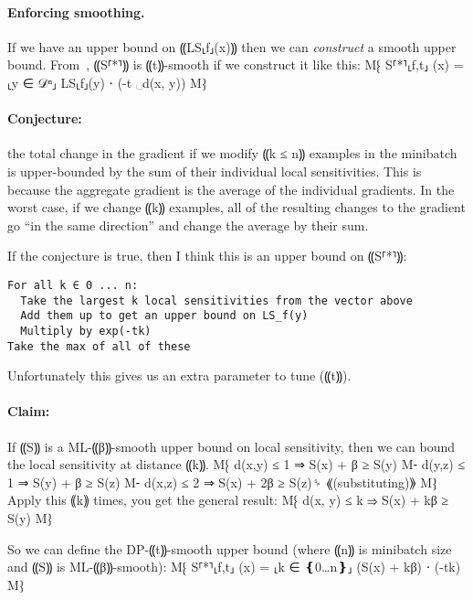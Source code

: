 \documentclass{article}
\begin{document}
\paragraph{Enforcing smoothing.}
If we have an upper bound on ⸨LS⸤f⸥(x)⸩ then we can \emph{construct} a
smooth upper bound. From~\cite{smooth-sensitivity}, ⸨S⸢*⸣⸩ is
⸨t⸩-smooth if we construct it like this:
%
M⁅ S⸢*⸣⸤f,t⸥ (x) = \max⸤y ∈ 𝒟ⁿ⸥ LS⸤f⸥(y) ⋅ \exp(-t ␣d(x, y))
M⁆

\paragraph{Conjecture:} the total change in the gradient if we modify
⸨k ≤ n⸩ examples in the minibatch is upper-bounded by the sum of their
individual local sensitivities. This is because the aggregate gradient
is the average of the individual gradients. In the worst case, if we
change ⸨k⸩ examples, all of the resulting changes to the gradient go
``in the same direction'' and change the average by their sum.


If the conjecture is true, then I think this is an upper bound on ⸨S⸢*⸣⸩:

\begin{verbatim}
For all k ∈ 0 ... n:
  Take the largest k local sensitivities from the vector above
  Add them up to get an upper bound on LS_f(y)
  Multiply by exp(-tk)
Take the max of all of these
\end{verbatim}

Unfortunately this gives us an extra parameter to tune (⸨t⸩).

\paragraph{Claim:} If ⸨S⸩ is a ML-⸨β⸩-smooth upper bound on local
sensitivity, then we can bound the local sensitivity at distance ⸨k⸩.
%
M⁅ d(x,y) ≤ 1 ⇒ S(x) + β ≥ S(y)
M⁃ d(y,z) ≤ 1 ⇒ S(y) + β ≥ S(z)
M⁃ d(x,z) ≤ 2 ⇒ S(x) + 2β ≥ S(z)␠ ⟪(substituting)⟫
M⁆
%
Apply this ⸨k⸩ times, you get the general result:
%
M⁅ d(x, y) ≤ k ⇒ S(x) + kβ ≥ S(y)
M⁆

So we can define the DP-⸨t⸩-smooth upper bound (where ⸨n⸩ is minibatch size
and ⸨S⸩ is ML-⸨β⸩-smooth):
%
M⁅ S⸢*⸣⸤f,t⸥ (x) = \max⸤k ∈ ❴0…n❵⸥ (S(x) + kβ) ⋅ \exp(-tk)
M⁆




\end{document}
